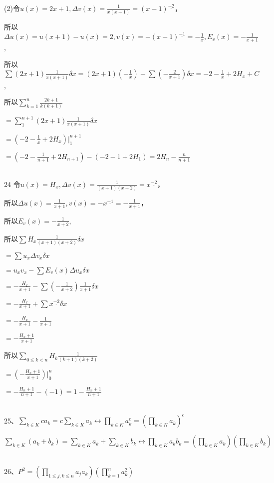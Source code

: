 \documentclass[onecolumn]{article}
\begin{document}
(2)令$u(x)=2x+1,\Delta v(x)=\frac{1}{x(x+1)}=(x-1)^{\underline{-2}}$，\par 
所以$\Delta u(x)=u(x+1)-u(x)=2,v(x)=-(x-1)^{\underline{-1}}=-\frac{1}{x},E_{v}(x)=-\frac{1}{x+1}$,\par
所以$\sum (2x+1)\frac{1}{x(x+1)}\delta x=(2x+1)(-\frac{1}{x})-\sum (-\frac{2}{x+1})\delta x=-2-\frac{1}{x}+2H_{x}+C$,\par
所以$\sum_{k=1}^{n}\frac{2k+1}{k(k+1)}$ \par
$= \sum_{1}^{n+1}(2x+1)\frac{1}{x(x+1)}\delta x$ \par
$=\left (-2-\frac{1}{x}+2H_{x}  \right )|_{1}^{n+1}$ \par
$=(-2-\frac{1}{n+1}+2H_{n+1})-(-2-1+2H_{1})=2H_{n}-\frac{n}{n+1}$ \par
~\\
24 令$u(x)=H_{x},\Delta v(x)=\frac{1}{(x+1)(x+2)}=x^{\underline{-2}}$，\par
所以$\Delta u(x)=\frac{1}{x+1},v(x)=-x^{\underline{-1}}=-\frac{1}{x+1}$，\par
所以$E_{v}(x)=-\frac{1}{x+2}$,\par
所以$\sum H_{x}\frac{1}{(x+1)(x+2)}\delta x$\par
$=\sum u_{x}\Delta v_{x}\delta x$\par
$=u_{x}v_{x}-\sum E_{v}(x)\Delta u_{x}\delta  x$\par
$=-\frac{H_{x}}{x+1}-\sum (-\frac{1}{x+2})\frac{1}{x+1}\delta  x$\par
$=-\frac{H_{x}}{x+1}+\sum x^{\underline{-2}}\delta x$\par
$=-\frac{H_{x}}{x+1}-\frac{1}{x+1}$\par
$=-\frac{H_{x}+1}{x+1}$\par
所以$\sum_{0\leq k < n} H_{k}\frac{1}{(k+1)(k+2)}$\par
$=\left (-\frac{H_{x}+1}{x+1}  \right )|_{0}^{n}$\par
$=-\frac{H_{n}+1}{n+1}-(-1)=1-\frac{H_{n}+1}{n+1}$\par
~\\
25、$\sum_{k\in K}ca_{k}=c\sum_{k\in K}a_{k}\leftrightarrow \prod _{k\in K}a_{k}^{c}=\left (\prod _{k\in K}a_{k}  \right )^{c}$ \par
$\sum_{k\in K}(a_{k}+b_{k})=\sum_{k\in K}a_{k}+\sum_{k\in K}b_{k}\leftrightarrow \prod _{k\in K}a_{k}b_{k}=\left (\prod _{k\in K}a_{k}  \right )\left (\prod _{k\in K}b_{k}  \right )$ \par
~\\
26、$P^{2}=\left (\prod_{1\leq j, k\leq n}a_{j}a_{k}  \right )\left ( \prod _{k=1}^{n}a_{k}^{2} \right )$ \par
\end{document}
